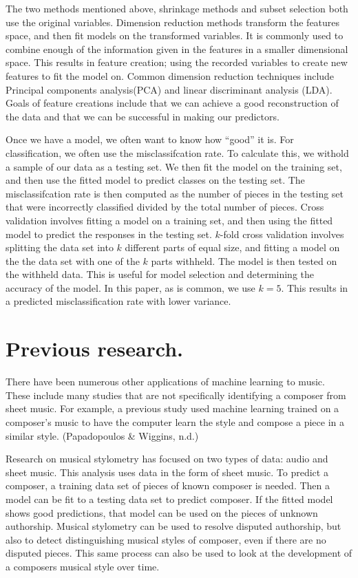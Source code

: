 \documentclass[12pt,twoside]{reedthesis}
\theoremstyle{definition}
\theoremstyle{definition}
\theoremstyle{definition}
\theoremstyle{remark}
\begin{document}
The two methods mentioned above, shrinkage methods and subset selection
both use the original variables. Dimension reduction methods transform
the features space, and then fit models on the transformed variables. It
is commonly used to combine enough of the information given in the
features in a smaller dimensional space. This results in feature
creation; using the recorded variables to create new features to fit the
model on. Common dimension reduction techniques include Principal
components analysis(PCA) and linear discriminant analysis (LDA). Goals
of feature creations include that we can achieve a good reconstruction
of the data and that we can be successful in making our predictors.

Once we have a model, we often want to know how ``good'' it is. For
classification, we often use the misclassifcation rate. To calculate
this, we withold a sample of our data as a testing set. We then fit the
model on the training set, and then use the fitted model to predict
classes on the testing set. The misclassifcation rate is then computed
as the number of pieces in the testing set that were incorrectly
classified divided by the total number of pieces. Cross validation
involves fitting a model on a training set, and then using the fitted
model to predict the responses in the testing set. \(k\)-fold cross
validation involves splitting the data set into \(k\) different parts of
equal size, and fitting a model on the the data set with one of the
\(k\) parts withheld. The model is then tested on the withheld data.
This is useful for model selection and determining the accuracy of the
model. In this paper, as is common, we use \(k = 5\). This results in a
predicted misclassification rate with lower variance.

\section{Previous research.}\label{previous-research.}

There have been numerous other applications of machine learning to
music. These include many studies that are not specifically identifying
a composer from sheet music. For example, a previous study used machine
learning trained on a composer's music to have the computer learn the
style and compose a piece in a similar style. (Papadopoulos \& Wiggins,
n.d.)

Research on musical stylometry has focused on two types of data: audio
and sheet music. This analysis uses data in the form of sheet music. To
predict a composer, a training data set of pieces of known composer is
needed. Then a model can be fit to a testing data set to predict
composer. If the fitted model shows good predictions, that model can be
used on the pieces of unknown authorship. Musical stylometry can be used
to resolve disputed authorship, but also to detect distinguishing
musical styles of composer, even if there are no disputed pieces. This
same process can also be used to look at the development of a composers
musical style over time.
\end{document}
